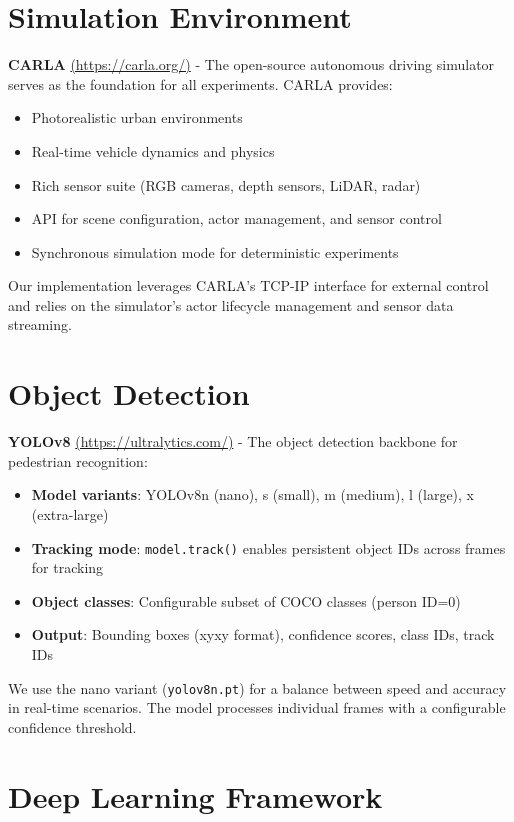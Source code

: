 \section{Simulation Environment}

\textbf{CARLA} \href{https://carla.org/}{(https://carla.org/)} - The open-source autonomous driving simulator serves as the foundation for all experiments. CARLA provides:
\begin{itemize}
    \item Photorealistic urban environments
    \item Real-time vehicle dynamics and physics
    \item Rich sensor suite (RGB cameras, depth sensors, LiDAR, radar)
    \item API for scene configuration, actor management, and sensor control
    \item Synchronous simulation mode for deterministic experiments
\end{itemize}

Our implementation leverages CARLA's TCP-IP interface for external control and relies on the simulator's actor lifecycle management and sensor data streaming.

\section{Object Detection}

\textbf{YOLOv8} \href{https://ultralytics.com/}{(https://ultralytics.com/)} - The object detection backbone for pedestrian recognition:
\begin{itemize}
    \item \textbf{Model variants}: YOLOv8n (nano), s (small), m (medium), l (large), x (extra-large)
    \item \textbf{Tracking mode}: \texttt{model.track()} enables persistent object IDs across frames for tracking
    \item \textbf{Object classes}: Configurable subset of COCO classes (person ID=0)
    \item \textbf{Output}: Bounding boxes (xyxy format), confidence scores, class IDs, track IDs
\end{itemize}

We use the nano variant (\texttt{yolov8n.pt}) for a balance between speed and accuracy in real-time scenarios. The model processes individual frames with a configurable confidence threshold.

\section{Deep Learning Framework}

